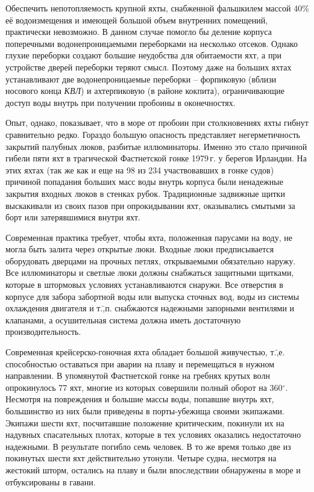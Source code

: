 \documentclass[a4paper, 12pt, twoside, final, book, russian, fittopage, cyremdash]{ncc}
\newcommand{\gr}{\ensuremath{^\circ}\xspace}
\begin{document}
Обеспечить непотопляемость крупной яхты, снабженной фальшкилем массой 40\% её водоизмещения и имеющей большой объем внутренних помещений, практически невозможно. В данном случае помогло бы деление корпуса поперечными водонепроницаемыми переборками на несколько отсеков. Однако глухие переборки создают большие неудобства для обитаемости яхт, а при устройстве дверей переборки теряют смысл. Поэтому даже на больших яхтах устанавливают две водонепроницаемые переборки \--- форпиковую (вблизи носового конца \textit{КВЛ}) и ахтерпиковую (в районе кокпита), ограничивающие доступ воды внутрь при получении пробоины в оконечностях. 

Опыт, однако, показывает, что в море от пробоин при столкновениях яхты гибнут сравнительно редко. Гораздо большую опасность представляет негерметичность закрытий палубных люков, разбитые иллюминаторы. Именно это стало причиной гибели пяти яхт в трагической Фастнетской гонке 1979\,г. у берегов Ирландии. На этих яхтах (так же как и еще на 98 из 234 участвовавших в гонке судов) причиной попадания больших масс воды внутрь корпуса были ненадежные закрытия входных люков в стенках рубок. Традиционные задвижные щитки выскакивали из своих пазов при опрокидывании яхт, оказывались смытыми за борт или затерявшимися внутри яхт.

Современная практика требует, чтобы яхта, положенная парусами на воду, не могла быть залита через открытые люки. Входные люки предписывается оборудовать дверцами на прочных петлях, открываемыми обязательно наружу. Все иллюминаторы и светлые люки должны снабжаться защитными щитками, которые в штормовых условиях устанавливаются снаружи. Все отверстия в корпусе для забора забортной воды или выпуска сточных вод, воды из системы охлаждения двигателя и т.\=,п. снабжаются надежными запорными вентилями и клапанами, а осушительная система должна иметь достаточную производительность.

Современная крейсерско-гоночная яхта обладает большой живучестью, т.\=,е. способностью оставаться при аварии на плаву и перемещаться в нужном направлении. В упомянутой Фастнетской гонке на гребнях крутых волн опрокинулось 77 яхт, многие из которых совершили полный оборот на 360\gr. Несмотря на повреждения и большие массы воды, попавшие внутрь яхт, большинство из них были приведены в порты-убежища своими экипажами. Экипажи шести яхт, посчитавшие положение критическим, покинули их на надувных спасательных плотах, которые в тех условиях оказались недостаточно надежными. В результате погибло семь человек. В то же время только две из покинутых шести яхт действительно утонули. Четыре судна, несмотря на жестокий шторм, остались на плаву и были впоследствии обнаружены в море и отбуксированы в гавани.
\end{document}
